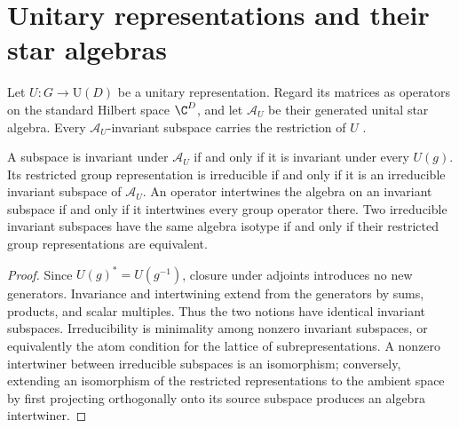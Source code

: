 \section{Unitary representations and their star algebras}
\label{sec:characters_unitary}

\begin{definition}
    \label{def:peps_unitary_representation_algebra}
    \leanok
    Let $U:G\to\mathrm U(D)$ be a unitary representation. Regard its
    matrices as operators on the standard Hilbert space $\C^D$,
    and let $\mathcal A_U$ be their generated unital star algebra.
    Every $\mathcal A_U$-invariant subspace carries the restriction of $U$
    \cite[Section~4.1]{Schuch2010PEPS}.
\end{definition}

\begin{lemma}
    \label{thm:peps_unitary_representation_algebra}
    \leanok
    A subspace is invariant under $\mathcal A_U$ if and only if it is
    invariant under every $U(g)$. Its restricted group representation
    is irreducible if and only if it is an irreducible invariant subspace
    of $\mathcal A_U$. An operator intertwines the algebra on an invariant
    subspace if and only if it intertwines every group operator there.
    Two irreducible invariant subspaces have the same algebra isotype
    if and only if their restricted group representations are equivalent.
\end{lemma}

\begin{proof}\leanok
    Since $U(g)^*=U(g^{-1})$, closure under adjoints introduces no new
    generators. Invariance and intertwining extend from the generators
    by sums, products, and scalar multiples. Thus the two notions have
    identical invariant subspaces. Irreducibility is minimality among
    nonzero invariant subspaces, or equivalently the atom condition for
    the lattice of subrepresentations. A nonzero intertwiner between
    irreducible subspaces is an isomorphism; conversely, extending an
    isomorphism of the restricted representations to the ambient space
    by first projecting orthogonally onto its source subspace produces an
    algebra intertwiner.
\end{proof}

